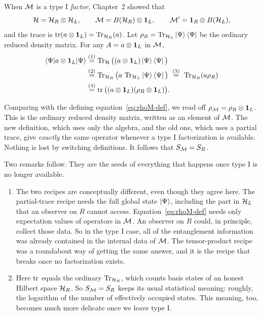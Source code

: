 When $\mathcal{M}$ is a type I \emph{factor}, Chapter~2 showed that
\[
\mathcal{H}=\mathcal{H}_R\otimes\mathcal{H}_L, \qquad \mathcal{M}=B(\mathcal{H}_R)\otimes\mathbf{1}_L, \qquad \mathcal{M}'=\mathbf{1}_R\otimes B(\mathcal{H}_L) ,
\]
and the trace is $\operatorname{tr}(a\otimes\mathbf{1}_L)=\operatorname{Tr}_{\mathcal{H}_R}(a)$. Let $\rho_R=\operatorname{Tr}_{\mathcal{H}_L}\ket\Psi\bra\Psi$ be the ordinary
reduced density matrix. For any $A=a\otimes\mathbf{1}_L$ in $\mathcal{M}$,
\begin{align}
\braket{\Psi|a\otimes\mathbf{1}_L|\Psi}
&\overset{(1)}{=} \operatorname{Tr}_{\mathcal{H}}\big((a\otimes\mathbf{1}_L)\ket\Psi\bra\Psi\big) \notag\\
&\overset{(2)}{=} \operatorname{Tr}_{\mathcal{H}_R}\big(a\,\operatorname{Tr}_{\mathcal{H}_L}\ket\Psi\bra\Psi\big)
\ \overset{(3)}{=}\ \operatorname{Tr}_{\mathcal{H}_R}(a\rho_R) \notag\\
&\overset{(4)}{=} \operatorname{tr}\big((a\otimes\mathbf{1}_L)(\rho_R\otimes\mathbf{1}_L)\big) . \notag
\end{align}
\quad
{}\quad
{}\quad
{}

Comparing with the defining equation~\eqref{eq:rhoM-def}, we read off $\rho_{\mathcal{M}}=\rho_R\otimes\mathbf{1}_L$. This is the
ordinary reduced density matrix, written as an element of $\mathcal{M}$. The new definition, which uses only the algebra,
and the old one, which uses a partial trace, give \emph{exactly} the same operator whenever a type I
factorization is available. Nothing is lost by switching definitions. It follows that $S_{\mathcal{M}}=S_R$.

Two remarks follow. They are the seeds of everything that happens once type I is no longer available.
\begin{enumerate}
\item The two recipes are conceptually different, even though they agree here. The partial-trace recipe needs
the full global state $\ket\Psi$, including the part in $\mathcal{H}_L$ that an observer on $R$ cannot access.
Equation~\eqref{eq:rhoM-def} needs only expectation values of operators in $\mathcal{M}$. An observer on $R$ could, in
principle, collect those data. So in the type I case, all of the entanglement information was already contained
in the internal data of $\mathcal{M}$. The tensor-product recipe was a roundabout way of getting the same answer, and it
is the recipe that breaks once no factorization exists.
\item Here $\operatorname{tr}$ equals the ordinary $\operatorname{Tr}_{\mathcal{H}_R}$, which counts basis states of an honest Hilbert space
$\mathcal{H}_R$. So $S_{\mathcal{M}}=S_R$ keeps its usual statistical meaning: roughly, the logarithm of the number of
effectively occupied states. This meaning, too, becomes much more delicate once we leave type I.
\end{enumerate}

